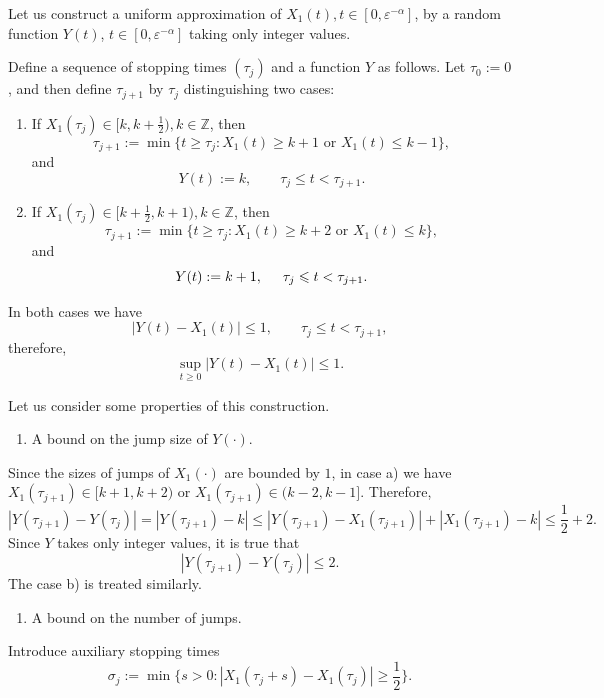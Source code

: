 \documentclass[12pt]{article}
\let\ep\varepsilon
\newcommand\Z{\mathbb Z}
\let\le\leqslant
\let\ge\geqslant
\theoremstyle{definition}
\begin{document}
Let us construct a uniform approximation of $X_1(t), t\in[0,\ep^{-\alpha}]$, by a random function
$Y(t)$, $t\in[0,\ep^{-\alpha}]$ taking only integer values.

Define a sequence of stopping times $(\tau_j)$ and a function $Y$ as follows. 
Let $\tau_0 := 0$, and then define $\tau_{j+1}$ by $\tau_j$ distinguishing two cases:
\begin{enumerate}
    \item[a)]  If $X_1(\tau_j)\in[k ,k + \frac12), k\in \Z$,
        then
        \[ 
            \tau_{j+1}:= \min\{t \ge \tau_j: X_1(t) \ge k+1 \text{ or } X_1(t) \le k-1\},
        \] 
         and
        \[
             Y(t):=k, \qquad \tau_j\le t < \tau_{j+1}.
        \]
    \item[b)] If $X_1(\tau_j)\in[k + \frac12 , k + 1), k\in \Z$,
        then
        \[
             \tau_{j+1}:= \min\{t \ge \tau_j: X_1(t) \ge k+2 \text{ or } X_1(t) \le k\},
        \] 
        and
        \[
              Y(t):=k + 1, \hspace{0.5cm} \tau_j\le t < \tau_{j+1}.
        \]
\end{enumerate}
        
In both cases we have 
\[ 
    |Y(t) - X_1(t)|\le 1, \qquad \tau_j\le t<\tau_{j+1},
\]
therefore,
\begin{equation}\label{mainlemma3: difference between Y and X}
    \sup_{t\ge 0} |Y(t) - X_1(t)| \le 1.
\end{equation}
        
Let us consider some properties of this construction.
\begin{enumerate}
    \item[1)] A bound on the jump size of $Y(\cdot)$.
\end{enumerate}
Since the sizes of jumps of $X_1(\cdot)$ are bounded by $1$, 
in case a) we have  $X_1(\tau_{j+1})\in [k+1, k+2)$ or $X_1(\tau_{j+1})\in(k-2, k-1]$. 
Therefore,
\begin{equation*}
            |Y(\tau_{j+1}) - Y(\tau_{j})| = |Y(\tau_{j+1}) - k| 
            \le |Y({\tau_{j+1}}) - X_1(\tau_{j+1})| + |X_1(\tau_{j+1}) - k|\le \frac12 + 2.
\end{equation*}
Since $Y$ takes only integer values, it is true that
\begin{equation} \label{jumpsize}
            |Y(\tau_{j+1}) - Y(\tau_j)| \le 2.
\end{equation}
The case b) is treated similarly.
        
\begin{enumerate}
            \item[2)] A bound on the number of jumps.
\end{enumerate}
Introduce auxiliary stopping times
\[   
    \sigma_j:=\min \big\{s>0: |X_1(\tau_j + s) - X_1(\tau_j)|\ge \frac12 \big\}.
\]
      
\end{document}
